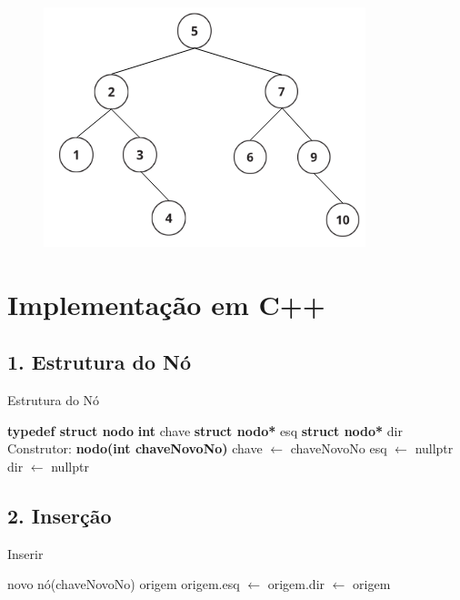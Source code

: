 \documentclass[a4paper,12pt]{article}
\begin{document}
\begin{enumerate}
    \begin{figure}[H]
	\centering
	\includegraphics[scale=0.7]{figures/binaria/passo4.png}
	\label{fig:bubble_sort_example}
    \end{figure}
\end{enumerate}

\section*{Implementação em C++}

\subsection*{1. Estrutura do Nó}
\begin{algorithm}[H]
\caption{Estrutura do Nó}
\begin{algorithmic}[1]
\State \textbf{typedef struct nodo} 
\State \quad \textbf{int} chave
\State \quad \textbf{struct nodo*} esq
\State \quad \textbf{struct nodo*} dir
\State \quad Construtor: \textbf{nodo(int chaveNovoNo)}
\State \quad \quad chave $\gets$ chaveNovoNo
\State \quad \quad esq $\gets$ nullptr
\State \quad \quad dir $\gets$ nullptr
\end{algorithmic}
\end{algorithm}

\subsection*{2. Inserção}
\begin{algorithm}[H]
\caption{Inserir}
\begin{algorithmic}[1]
        \State \Return novo nó(chaveNovoNo)
    \EndIf
        \State \Return origem
        \State origem.esq $\gets$ 
    \Else
        \State origem.dir $\gets$ 
    \EndIf
    \State \Return origem
\EndFunction
\end{algorithmic}
\end{algorithm}
\end{document}
